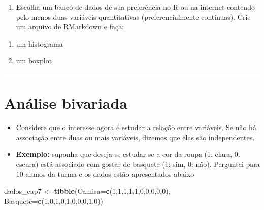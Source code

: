 \documentclass[
]{book}
\newenvironment{Shaded}{\begin{snugshade}}{\end{snugshade}}
\newcommand{\AttributeTok}[1]{\textcolor[rgb]{0.13,0.29,0.53}{#1}}
\newcommand{\DecValTok}[1]{\textcolor[rgb]{0.00,0.00,0.81}{#1}}
\newcommand{\FunctionTok}[1]{\textcolor[rgb]{0.13,0.29,0.53}{\textbf{#1}}}
\newcommand{\NormalTok}[1]{#1}
\newcommand{\OtherTok}[1]{\textcolor[rgb]{0.56,0.35,0.01}{#1}}
\providecommand{\tightlist}{%
  \setlength{\itemsep}{0pt}\setlength{\parskip}{0pt}}
\begin{document}
\begin{enumerate}
\def\labelenumi{\arabic{enumi}.}
\tightlist
\item
  Escolha um banco de dados de sua preferência no R ou na internet contendo pelo menos duas variáveis quantitativas (preferencialmente contínuas). Crie um arquivo de RMarkdown e faça:
\end{enumerate}

\begin{enumerate}
\def\labelenumi{\alph{enumi}.}
\tightlist
\item
  um histograma
\item
  um boxplot
\end{enumerate}

\begin{center}\rule{0.5\linewidth}{0.5pt}\end{center}

\chapter{Análise bivariada}\label{anaise_bi7}

\begin{itemize}
\item
  Considere que o interesse agora é estudar a relação entre variáveis. Se não há associação entre duas ou mais variáveis, dizemos que elas são independentes.
\item
  \textbf{Exemplo:} suponha que deseja-se estudar se a cor da roupa (1: clara, 0: escura) está associado com gostar de basquete (1: sim, 0: não). Perguntei para 10 alunos da turma e os dados estão apresentados abaixo
\end{itemize}

\begin{Shaded}
\begin{Highlighting}[]
\NormalTok{dados\_cap7 }\OtherTok{\textless{}{-}} \FunctionTok{tibble}\NormalTok{(}\AttributeTok{Camisa=}\FunctionTok{c}\NormalTok{(}\DecValTok{1}\NormalTok{,}\DecValTok{1}\NormalTok{,}\DecValTok{1}\NormalTok{,}\DecValTok{1}\NormalTok{,}\DecValTok{1}\NormalTok{,}\DecValTok{0}\NormalTok{,}\DecValTok{0}\NormalTok{,}\DecValTok{0}\NormalTok{,}\DecValTok{0}\NormalTok{,}\DecValTok{0}\NormalTok{),}
                \AttributeTok{Basquete=}\FunctionTok{c}\NormalTok{(}\DecValTok{1}\NormalTok{,}\DecValTok{0}\NormalTok{,}\DecValTok{1}\NormalTok{,}\DecValTok{0}\NormalTok{,}\DecValTok{1}\NormalTok{,}\DecValTok{0}\NormalTok{,}\DecValTok{0}\NormalTok{,}\DecValTok{0}\NormalTok{,}\DecValTok{1}\NormalTok{,}\DecValTok{0}\NormalTok{))}
\end{Highlighting}
\end{Shaded}
\end{document}
